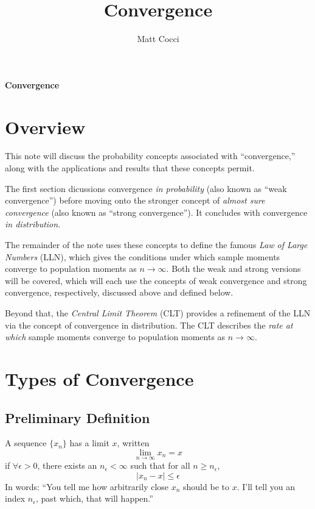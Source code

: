 \documentclass[a4paper,12pt]{scrartcl}
\author{Matt Cocci}
\title{Convergence}
\date{}
\begin{document}
\begin{center}
   \LARGE
   \textbf{Convergence}
\end{center}

\section{Overview}

This note will discuss the probability concepts associated
with ``convergence,'' along with the applications and 
results that these concepts permit.

The first section dicussions convergence 
\emph{in probability} (also known as ``{weak convergence}'')
before moving onto the stronger
concept of \emph{almost sure convergence} (also known 
as ``{strong convergence}'').  It concludes
with convergence \emph{in distribution}. 

The remainder of the note uses these concepts to
define the famous \emph{Law of Large Numbers} (LLN), which
gives the conditions under which sample moments converge
to population moments as $n\rightarrow \infty$.
Both the weak and strong versions will be covered, which will
each use the concepts of weak convergence and strong 
convergence, respectively, discussed above and defined below.

Beyond that, the \emph{Central Limit Theorem} (CLT) provides a
refinement of the LLN via the concept of convergence in 
distribution.  The CLT describes the \emph{rate at which}
sample moments converge to population moments as 
$n\rightarrow\infty$. 



\section{Types of Convergence}

\subsection{Preliminary Definition}

A sequence $\{x_n\}$ has a limit $x$, written 
\begin{equation}
    \lim_{n\rightarrow\infty} x_n = x
\end{equation}
if $\forall \epsilon > 0$, there exists an $n_\epsilon < \infty$
such that for all $n \geq n_\epsilon$,  
    \[  |x_n - x| \leq \epsilon \]
In words: ``You tell me how arbitrarily close $x_n$ should
be to $x$. I'll tell you an index $n_\epsilon$, past which,
that will happen.''
\end{document}
